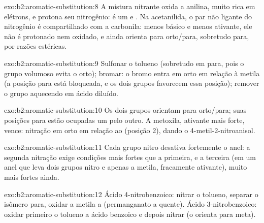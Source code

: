 \begin{solution}{exo:b2:aromatic-substitution:8}
A mistura nitrante oxida a anilina, muito rica em elétrons, e protona seu
nitrogênio:  é um  e . Na acetanilida,
o par não ligante do nitrogênio é compartilhado com a carbonila: menos básico e
menos ativante, ele não é protonado nem oxidado, e ainda orienta para
orto/para, sobretudo para, por razões estéricas.
\end{solution}

\begin{solution}{exo:b2:aromatic-substitution:9}
Sulfonar o tolueno (sobretudo em para, pois o grupo volumoso evita o orto);
bromar: o bromo entra em orto em relação à metila (a posição para está
bloqueada, e os dois grupos favorecem essa posição); remover o grupo 
aquecendo em ácido diluído.
\end{solution}

\begin{solution}{exo:b2:aromatic-substitution:10}
Os dois grupos orientam para orto/para; suas posições para estão ocupadas um
pelo outro. A metoxila, ativante mais forte, vence: nitração em orto em relação
ao  (posição 2), dando o 4-metil-2-nitroanisol.
\end{solution}

\begin{solution}{exo:b2:aromatic-substitution:11}
Cada grupo nitro desativa fortemente o anel: a segunda nitração exige
condições mais fortes que a primeira, e a terceira (em um anel que leva dois
grupos nitro e apenas a metila, fracamente ativante), muito mais fortes ainda.
\end{solution}

\begin{solution}{exo:b2:aromatic-substitution:12}
Ácido 4-nitrobenzoico: nitrar o tolueno, separar o isômero para, oxidar a
metila a  (permanganato a quente). Ácido 3-nitrobenzoico: oxidar
primeiro o tolueno a ácido benzoico e depois nitrar (o  orienta para
meta).
\end{solution}

